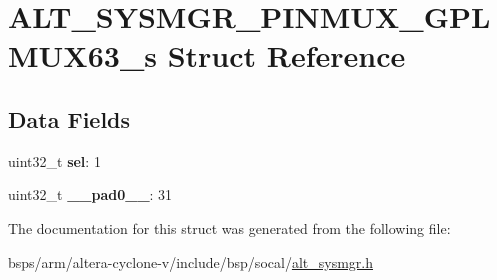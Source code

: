 \hypertarget{structALT__SYSMGR__PINMUX__GPLMUX63__s}{}\section{A\+L\+T\+\_\+\+S\+Y\+S\+M\+G\+R\+\_\+\+P\+I\+N\+M\+U\+X\+\_\+\+G\+P\+L\+M\+U\+X63\+\_\+s Struct Reference}
\label{structALT__SYSMGR__PINMUX__GPLMUX63__s}
\subsection*{Data Fields}
\begin{DoxyCompactItemize}
\item 
\mbox{\label{structALT__SYSMGR__PINMUX__GPLMUX63__s_ab6a753c570961cc924253486f836b6be}} 
uint32\+\_\+t {\bfseries sel}\+: 1
\item 
\mbox{\label{structALT__SYSMGR__PINMUX__GPLMUX63__s_a98d5bc3bb843128f91ff3d2f86fab18f}} 
uint32\+\_\+t {\bfseries \+\_\+\+\_\+pad0\+\_\+\+\_\+}\+: 31
\end{DoxyCompactItemize}


The documentation for this struct was generated from the following file\+:\begin{DoxyCompactItemize}
\item 
bsps/arm/altera-\/cyclone-\/v/include/bsp/socal/\mbox{\hyperlink{alt__sysmgr_8h}{alt\+\_\+sysmgr.\+h}}\end{DoxyCompactItemize}
